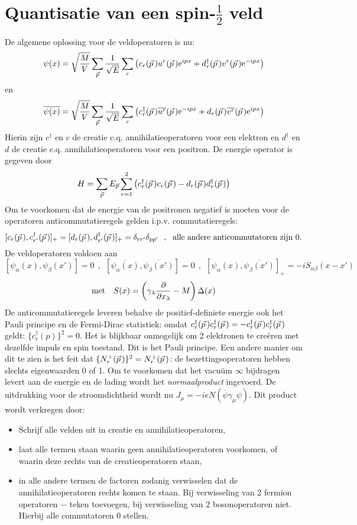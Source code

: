 \documentclass[twoside]{report}
\begin{document}
\section[~~Quantisatie van een spin-$\frac{1}{2}$ veld]{Quantisatie van een spin-$\frac{1}{2}$ veld}
De algemene oplossing voor de veldoperatoren is nu:
\[
\psi(x)=\sqrt{\frac{M}{V}}\sum_{\vec{p}}\frac{1}{\sqrt{E}}\sum_r
\left(c_r(\vec{p}\,)u^r(\vec{p}\,){\rm e}^{ipx}+
d^\dagger_r(\vec{p}\,)v^r(\vec{p}\,){\rm e}^{-ipx}\right)
\]
en
\[
\overline{\psi(x)}=\sqrt{\frac{M}{V}}\sum_{\vec{p}}\frac{1}{\sqrt{E}}\sum_r
\left(c^\dagger_r(\vec{p}\,)\overline{u^r}(\vec{p}\,){\rm e}^{-ipx}+
d_r(\vec{p}\,)\overline{v^r}(\vec{p}\,){\rm e}^{ipx}\right)
\]
Hierin zijn $c^\dagger$ en $c$ de creatie c.q. annihilatieoperatoren voor een
elektron en $d^\dagger$ en $d$ de creatie c.q. annihilatieoperatoren voor een
positron. De energie operator is gegeven door
\[
H=\sum_{\vec{p}}E_{\vec{p}}\sum_{r=1}^2\left(c_r^\dagger(\vec{p}\,)c_r(\vec{p}\,)-d_r(\vec{p}\,)d^\dagger_r(\vec{p}\,)\right)
\]
Om te voorkomen dat de energie van de positronen negatief is moeten voor de
operatoren anticommutatieregels gelden i.p.v. commutatieregels:
\[
[c_r(\vec{p}\,),c_{r'}^\dagger(\vec{p}\,)]_+=[d_r(\vec{p}\,),d_{r'}^\dagger(\vec{p}\,)]_+=\delta_{rr'}\delta_{pp'}~~,~~
\mbox{alle andere anticommutatoren zijn 0.}
\]
De veldoperatoren voldoen aan
\[
[\psi_\alpha(x),\psi_\beta(x')]=0~~,~~
[\overline{\psi_\alpha(x)},\overline{\psi_\beta(x')}]=0~~,~~
[\psi_\alpha(x),\overline{\psi_\beta(x')}]_+=-iS_{\alpha\beta}(x-x')
\]
\[
\mbox{met}~~~S(x)=\left(\gamma_\lambda\frac{\partial }{\partial x_\lambda}-M\right)\Delta(x)
\]
De anticommutatieregels leveren behalve de positief-definiete energie ook het
Pauli principe en de Fermi-Dirac statistiek: omdat
$c_r^\dagger(\vec{p}\,)c_r^\dagger(\vec{p}\,)=-c_r^\dagger(\vec{p}\,)c_r^\dagger(\vec{p}\,)$
geldt: $\{c_r^\dagger(p)\}^2=0$. Het is blijkbaar onmogelijk om 2 elektronen
te cre\"eren met dezelfde impuls en spin toestand. Dit is het Pauli principe.
Een andere manier om dit te zien is het feit dat
$\{N_r^+(\vec{p}\,)\}^2=N_r^+(\vec{p}\,)$: de bezettingsoperatoren hebben slechts
eigenwaarden 0 of 1.
\npar
Om te voorkomen dat het vacu\"um $\infty$ bijdragen levert aan de energie en
de lading wordt het {\it normaalproduct} ingevoerd. De uitdrukking voor de
stroomdichtheid wordt nu $J_\mu=-ieN(\overline{\psi}\gamma_\mu\psi)$. Dit
product wordt verkregen door:
\begin{itemize}
\item Schrijf alle velden uit in creatie en annihilatieoperatoren,
\item laat alle termen staan waarin geen annihilatieoperatoren voorkomen, of
      waarin deze rechts van de creatieoperatoren staan,
\item in alle andere termen de factoren zodanig verwisselen dat de
      annihilatieoperatoren rechts komen te staan. Bij verwisseling van 2
      fermion operatoren $-$ teken toevoegen, bij verwisseling van 2
      bosonoperatoren niet. Hierbij alle commutatoren 0 stellen.
\end{itemize}
\end{document}
